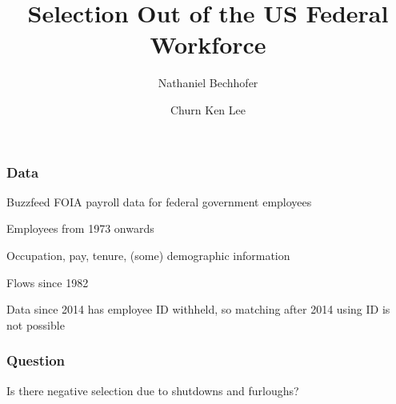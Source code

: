 \documentclass[aspectratio=169]{beamer}
\title{Selection Out of the US Federal Workforce}
\author{Nathaniel Bechhofer \and Churn Ken Lee}
\institute{UC San Diego}
\date{}
\newenvironment{wideitemize}{\itemize\addtolength{\itemsep}{10pt}}{\enditemize}
\begin{document}
\begin{frame}
    \titlepage
\end{frame}

\begin{frame}
    \frametitle{Data}

    \begin{wideitemize}
        \item Buzzfeed FOIA payroll data for federal government employees
        \item Employees from 1973 onwards
        \item Occupation, pay, tenure, (some) demographic information
        \item Flows since 1982
        \item Data since 2014 has employee ID withheld, so matching after 2014 using ID is not possible
    \end{wideitemize}

\end{frame}

\begin{frame}
    \frametitle{Question}

    Is there negative selection due to shutdowns and furloughs?

\end{frame}
\end{document}
